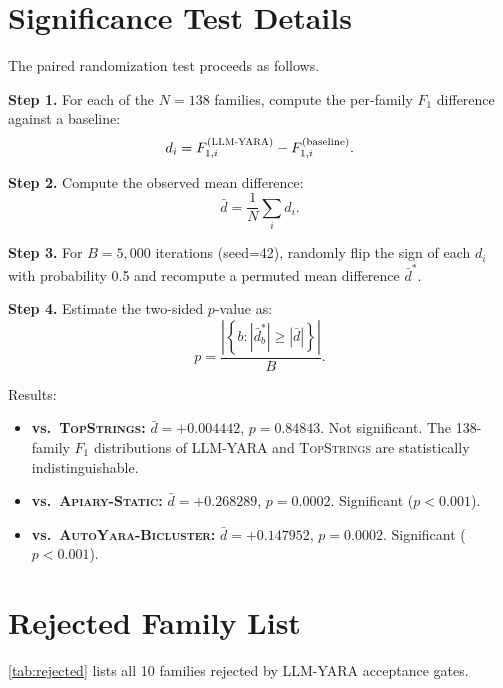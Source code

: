 \documentclass[10pt,twocolumn]{article}
\newcommand{\sysname}{\textsc{LLM-YARA}\xspace}
\newcommand{\topstrings}{\textsc{TopStrings}\xspace}
\newcommand{\apiary}{\textsc{Apiary-Static}\xspace}
\newcommand{\autoyara}{\textsc{AutoYara-Bicluster}\xspace}
\begin{document}
\section{Significance Test Details}
\label{app:significance}

The paired randomization test proceeds as follows.

\textbf{Step 1.} For each of the $N=138$ families, compute the
per-family $F_1$ difference against a baseline:
\[
d_i = F_{1,i}^{(\text{\sysname})} - F_{1,i}^{(\text{baseline})}.
\]

\textbf{Step 2.} Compute the observed mean difference:
\[
\bar{d} = \frac{1}{N}\sum_i d_i.
\]

\textbf{Step 3.} For $B=5{,}000$ iterations (seed=42), randomly flip the
sign of each $d_i$ with probability 0.5 and recompute a permuted mean
difference $\bar{d}^{*}$.

\textbf{Step 4.} Estimate the two-sided $p$-value as:
\[
p = \frac{\left|\left\{ b : \left|\bar{d}^{*}_{b}\right| \geq \left|\bar{d}\right| \right\}\right|}{B}.
\]

Results:
\begin{itemize}[nosep,leftmargin=1.2em]
  \item \textbf{vs.\ \topstrings:}
    $\bar{d}=+0.004442$, $p=0.84843$. Not significant.
    The 138-family $F_1$ distributions of \sysname and \topstrings are
    statistically indistinguishable.
  \item \textbf{vs.\ \apiary:}
    $\bar{d}=+0.268289$, $p=0.0002$. Significant ($p<0.001$).
  \item \textbf{vs.\ \autoyara:}
    $\bar{d}=+0.147952$, $p=0.0002$. Significant ($p<0.001$).
\end{itemize}

\section{Rejected Family List}
\label{app:rejected}

\cref{tab:rejected} lists all 10 families rejected by \sysname
acceptance gates.
\end{document}
